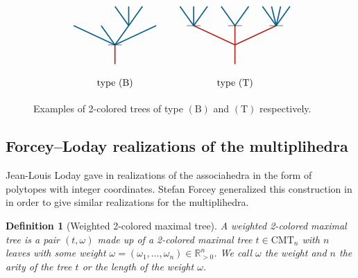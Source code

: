 \documentclass[twoside, 12pt]{amsart}
\newtheorem{definition}{Definition}[section]
\theoremstyle{remark}
\newcommand{\RR}{\mathbb{R}}
\newcommand{\CMT}[1]{\mathrm{CMT}_{#1}}
\newcommand{\B}{\mathrm{B}}
\newcommand{\T}{\mathrm{T}}
\begin{document}
\begin{figure}[h]
\[\vcenter{\hbox{
\begin{tikzpicture}[yscale=0.7,xscale=1]
\draw[very thick, MidnightBlue] (0.5,1)--(0,2);
\draw[very thick, MidnightBlue] (0.5,1)--(0.5,2);
\draw[very thick, MidnightBlue] (0.5,1)--(1,2);
\draw[very thick, MidnightBlue] (0,0)--(0.5, 1); 
\draw[very thick, MidnightBlue] (0,0)--(-0.5, 1); 
\draw[very thick, MidnightBlue] (0,0)--(-1.5,1);
\draw[very thick, MidnightBlue] (0,0)--(1.5, 1);
\draw[very thick, BrickRed] (0,-1)--(0, 0); 
\draw (-0.25,0) to (0.25,0); 
\draw (0,-2) node {type $(\B)$};
\end{tikzpicture}}}\qquad \vcenter{\hbox{
\begin{tikzpicture}[yscale=0.7,xscale=1]
\draw[very thick, MidnightBlue] (-1.5,1)--(-1.5,2);
\draw[very thick, MidnightBlue] (-2,2) -- (-1.75,1.5);
\draw[very thick, MidnightBlue] (-1.25, 1.5) -- (-1,2);
\draw[very thick, MidnightBlue] (-0.5,2) -- (0,1);
\draw[very thick, MidnightBlue] (0,1)--(0.5,2);
\draw[very thick, MidnightBlue] (1.5,1)--(1,2);
\draw[very thick, MidnightBlue] (1.5,1)--(1.33,2);
\draw[very thick, MidnightBlue] (1.5,1)--(1.66,2);
\draw[very thick, MidnightBlue] (1.5,1)--(2,2);
\draw[very thick, MidnightBlue] (-1.5,1)--(-1.75, 1.5); 
\draw[very thick, MidnightBlue] (-1.5,1)--(-1.25, 1.5); 
\draw[very thick, BrickRed] (0,-1)--(0, 1); 
\draw[very thick, BrickRed] (0,0)--(-1.5,1);
\draw[very thick, BrickRed] (0,0)--(1.5, 1);
\draw (-1.75,1) to (-1.25,1); 
\draw (-0.25,1) to (0.25,1); 
\draw (1.25,1) to (1.75,1);
\draw (0,-2) node {type $(\T)$};
\end{tikzpicture}}}\]
\caption{Examples of 2-colored trees of type $(\B)$ and $(\T)$ respectively. }
\label{Fig5:FacetsColoredTrees}
\end{figure}

\subsection{Forcey--Loday realizations of the multiplihedra}
Jean-Louis Loday gave in \cite{Loday04a} realizations of the associahedra in the form of polytopes with integer coordinates. 
Stefan Forcey generalized this construction in \cite{Forcey08} in order to give similar realizations for the multiplihedra. 

\begin{definition}[Weighted 2-colored maximal tree]
A \emph{weighted 2-colored maximal tree} is a pair $(t, \omega)$ made up of a 2-colored maximal tree $t\in \CMT{n}$ with $n$ leaves with some weight $\omega= (\omega_1, \ldots, \omega_n) \in \RR_{>0}^n$. 
We call $\omega$ the \emph{weight} and
$n$ the \emph{arity} of the tree $t$ or the \emph{length} of the weight $\omega$.
\end{definition}
\end{document}
